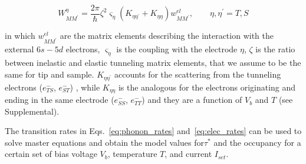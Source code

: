 \documentclass[
reprint,amsmath,amssymb,aps]{revtex4-2}
\begin{document}
\begin{equation}
    W_{MM^{\prime}}^{\eta}=\dfrac{2\pi}{\hbar} \zeta^2 \varsigma_{\eta} \left( K_{\eta \eta^{\prime}}+ K_{\eta \eta} \right)w_{MM^{\prime}}^{el}, \qquad \eta,\eta^{\prime}=T,S
    \label{eq:elec_rates}
\end{equation}

in which $w_{MM^{\prime}}^{el}$ are the matrix elements describing the interaction with the external $6s-5d$ electrons, $\varsigma_{\eta}$ is the coupling with the electrode $\eta$, $\zeta$ is the ratio between inelastic and elastic tunneling matrix elements, that we assume to be the same for tip and sample. $K_{\eta \eta^{\prime}}$ accounts for the scattering from the tunneling electrons ($e^{-}_{TS}$, $e^{-}_{ST}$) , while $K_{\eta \eta}$ is the analogous for the electrons originating and ending in the same electrode ($e^{-}_{SS}$, $e^{-}_{TT}$) and they are a function of $V_b$ and $T$ (see Supplemental).





The transition rates in Eqs.~\ref{eq:phonon_rates} and~\ref{eq:elec_rates} can be used to solve master equations \cite{delgado2010,Khajetoorians2013,loth2010,cervetti2016} and obtain the model values for$\tau^*$ and the occupancy for a certain set of bias voltage $V_{b}$, temperature $T$, and current $I_{set}$. 
\end{document}
